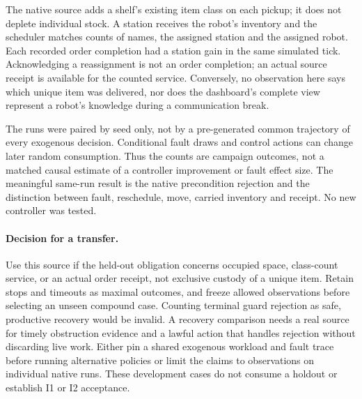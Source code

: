 \documentclass[11pt]{article}
\begin{document}
The native source adds a shelf's existing item class on each
pickup; it does not deplete individual stock. A station receives
the robot's inventory and the scheduler matches counts of names,
the assigned station and the assigned robot. Each recorded
order completion had a station gain in the same simulated tick.
Acknowledging a reassignment is not an order completion;
an actual source receipt is available for the counted service.
Conversely, no observation here says which unique item was delivered,
nor does the dashboard's complete view represent a robot's
knowledge during a communication break.

The runs were paired by seed only, not by a pre-generated common
trajectory of every exogenous decision. Conditional fault draws
and control actions can change later random consumption. Thus
the counts are campaign outcomes, not a matched causal estimate
of a controller improvement or fault effect size. The meaningful
same-run result is the native precondition rejection and the
distinction between fault, reschedule, move, carried inventory
and receipt. No new controller was tested.

\paragraph{Decision for a transfer.}
Use this source if the held-out obligation concerns occupied space,
class-count service, or an actual order receipt, not exclusive
custody of a unique item. Retain stops and timeouts as maximal
outcomes, and freeze allowed observations before selecting an
unseen compound case. Counting terminal guard rejection as safe,
productive recovery would be invalid. A recovery comparison needs
a real source for timely obstruction evidence and a lawful action
that handles rejection without discarding live work. Either pin a
shared exogenous workload and fault trace before running alternative
policies or limit the claims to observations on individual native
runs. These development cases do not consume a holdout or establish
I1 or I2 acceptance.
\end{document}
